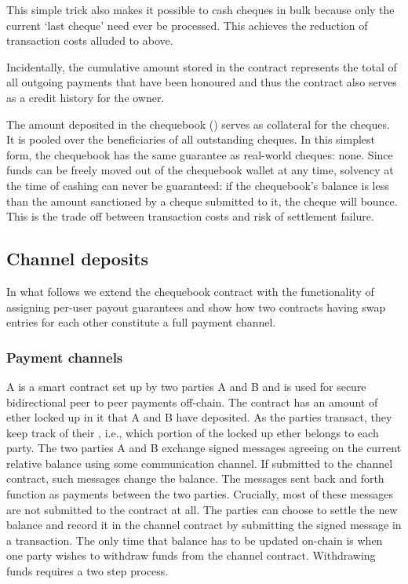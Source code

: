 This simple trick also makes it possible to cash cheques in bulk because only the current `last cheque' need ever be processed. This achieves the reduction of transaction costs alluded to above.

Incidentally, the cumulative amount stored in the contract represents the total of all outgoing payments that have been honoured and thus the contract also serves as a credit history for the owner.

The amount deposited in the chequebook () serves as collateral for the cheques. It is pooled over the beneficiaries of all outstanding cheques.
In this simplest form, the chequebook has the same guarantee as real-world cheques: none. Since funds can be freely moved out of the chequebook wallet at any time, solvency at the time of cashing can never be guaranteed: if the chequebook's balance is less than the amount sanctioned by a cheque submitted to it, the cheque will bounce. This is the trade off between transaction costs and risk of settlement failure.





\subsection{Channel deposits}

In what follows we extend the chequebook contract with the functionality of assigning per-user payout guarantees and show how two contracts having swap entries for each other constitute a full payment channel. 

\subsubsection{Payment channels}

A  is a smart contract set up by two parties A and B and is used for secure bidirectional peer to peer payments off-chain. The contract has an amount of ether locked up in it that A and B have deposited. As the parties transact, they keep track of their , i.e., which portion of the locked up ether belongs to each party. The two parties A and B exchange signed messages agreeing on the current relative balance using some communication channel. If submitted to the channel contract, such messages change the balance. The messages sent back and forth function as payments between the two parties. Crucially, most of these messages are not submitted to the contract at all. The parties can choose to settle the new balance and record it in the channel contract by submitting the signed message in a transaction. The only time that balance has to be updated on-chain is when one party wishes to withdraw funds from the channel contract. Withdrawing funds requires a two step process.

